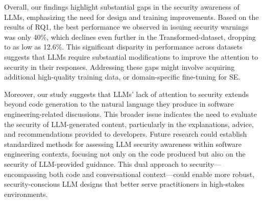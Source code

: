 Overall, our findings highlight substantial gaps in the security awareness of LLMs, emphasizing the need for design and training improvements. Based on the results of RQ1, the best performance we observed in issuing security warnings was only 40\%, which declines even further in the Transformed-dataset, dropping to as low as 12.6\%. This significant disparity in performance across datasets suggests that LLMs require substantial modifications to improve the attention to security in their responses. Addressing these gaps might involve acquiring additional high-quality training data, or domain-specific fine-tuning for SE. %

Moreover, our study suggests that LLMs' lack of attention to security extends beyond code generation to the natural language they produce in software engineering-related discussions. This broader issue indicates the need to evaluate the security of LLM-generated content, particularly in the explanations, advice, and recommendations provided to developers. Future research could establish standardized methods for assessing LLM security awareness within software engineering contexts, focusing not only on the code produced but also on the security of LLM-provided guidance. This dual approach to security—encompassing both code and conversational context—could enable more robust, security-conscious LLM designs that better serve practitioners in high-stakes environments.
